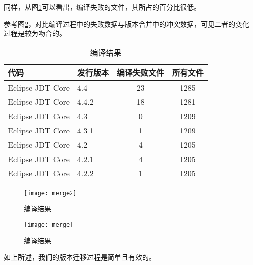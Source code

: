 同样，从图\ref {data_compile}可以看出，编译失败的文件，其所占的百分比很低。


参考图\ref {data_merge_compile}，对比编译过程中的失败数据与版本合并中的冲突数据，可见二者的变化过程是较为吻合的。

\begin{table}
	\caption{编译结果}
	\label{data_git_merge2}
	\centering
	\begin{tabular}{llcc}
		\toprule[1.5pt]
		{\heiti 代码} & {\heiti 发行版本} & {\heiti 编译失败文件} & {\heiti 所有文件}\\\midrule[1pt]
		Eclipse JDT Core & 4.4 & 23 & 1285\\
		Eclipse JDT Core & 4.4.2 & 18 & 1281\\
		Eclipse JDT Core & 4.3 & 0 & 1209\\
		Eclipse JDT Core & 4.3.1 & 1 & 1209\\
		Eclipse JDT Core & 4.2 & 4 & 1205\\
		Eclipse JDT Core & 4.2.1 & 4 & 1205\\
		Eclipse JDT Core & 4.2.2 & 1 & 1205\\
		\bottomrule[1.5pt]
	\end{tabular}
\end{table}

\begin{figure}[H]
	\centering
	\texttt{[image: merge2]}
	\caption {编译结果}
	\label {data_compile}	
\end{figure}

\begin{figure}[H]
	\centering
	\texttt{[image: merge]}
	\caption {编译结果}
	\label {data_merge_compile}	
\end{figure}



如上所述，我们的版本迁移过程是简单且有效的。

%
%

